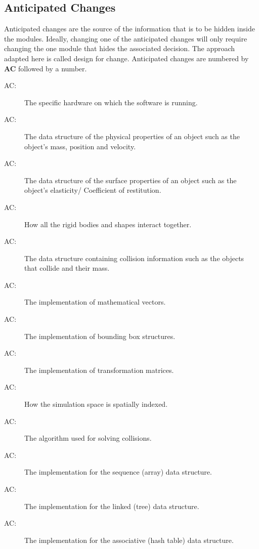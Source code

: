 \documentclass[12pt]{article}
\newcounter{acnum}
\newcommand{\actheacnum}{AC\theacnum}
\begin{document}
\subsection{Anticipated Changes} \label{SecAchange}

Anticipated changes are the source of the information that is to be hidden
inside the modules. Ideally, changing one of the anticipated changes will only
require changing the one module that hides the associated decision. The approach
adapted here is called design for
change. Anticipated changes are numbered by \textbf{AC} followed by a number.

\begin{description}
\item[ \actheacnum \label{acHardware}:] The specific
  hardware on which the software is running.
\item[ \actheacnum \label{acBody}:] The data structure of the
physical properties of an object such as the object's mass, position and velocity.
\item[ \actheacnum \label{acShape}:] The data structure of the
surface properties of an object such as the object's elasticity/ Coefficient of restitution.
\item[ \actheacnum \label{acSpace}:] How all the rigid
bodies and shapes interact together.
\item[ \actheacnum \label{acCollision}:] The data structure containing collision information such as the objects that collide and their mass. 
\item[ \actheacnum \label{acVector}:] The implementation of mathematical vectors.
\item[ \actheacnum \label{acBBox}:] The implementation of bounding box structures.
\item[ \actheacnum \label{acTrans}:] The implementation of transformation matrices.
\item[ \actheacnum \label{acSpatialIndex}:] How the simulation space is spatially indexed.
\item[ \actheacnum \label{acSolver}:] The algorithm used for solving collisions.
\item[ \actheacnum \label{acSeqDS}:] The implementation for the sequence (array) data structure.
\item[ \actheacnum \label{acLinkDS}:] The implementation for the linked (tree) data structure.
\item[ \actheacnum \label{acAssocDS}:] The implementation for the associative (hash table) data structure.
\end{description}
\end{document}

